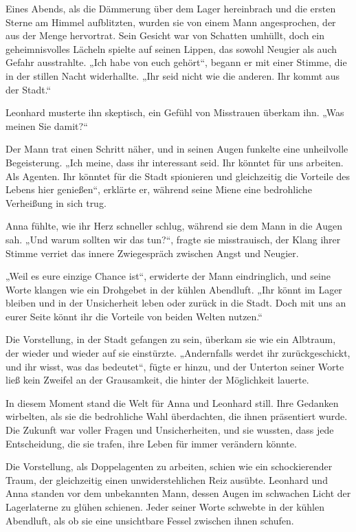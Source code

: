 \documentclass[
]{article}
\begin{document}
Eines Abends, als die Dämmerung über dem Lager hereinbrach und die
ersten Sterne am Himmel aufblitzten, wurden sie von einem Mann
angesprochen, der aus der Menge hervortrat. Sein Gesicht war von
Schatten umhüllt, doch ein geheimnisvolles Lächeln spielte auf seinen
Lippen, das sowohl Neugier als auch Gefahr ausstrahlte. „Ich habe von
euch gehört``, begann er mit einer Stimme, die in der stillen Nacht
widerhallte. „Ihr seid nicht wie die anderen. Ihr kommt aus der Stadt.``

Leonhard musterte ihn skeptisch, ein Gefühl von Misstrauen überkam ihn.
„Was meinen Sie damit?{\kern0pt}``

Der Mann trat einen Schritt näher, und in seinen Augen funkelte eine
unheilvolle Begeisterung. „Ich meine, dass ihr interessant seid. Ihr
könntet für uns arbeiten. Als Agenten. Ihr könntet für die Stadt
spionieren und gleichzeitig die Vorteile des Lebens hier genießen``,
erklärte er, während seine Miene eine bedrohliche Verheißung in sich
trug.

Anna fühlte, wie ihr Herz schneller schlug, während sie dem Mann in die
Augen sah. „Und warum sollten wir das tun?{\kern0pt}``, fragte sie
misstrauisch, der Klang ihrer Stimme verriet das innere Zwiegespräch
zwischen Angst und Neugier.

„Weil es eure einzige Chance ist``, erwiderte der Mann eindringlich, und
seine Worte klangen wie ein Drohgebet in der kühlen Abendluft. „Ihr
könnt im Lager bleiben und in der Unsicherheit leben oder zurück in die
Stadt. Doch mit uns an eurer Seite könnt ihr die Vorteile von beiden
Welten nutzen.``

Die Vorstellung, in der Stadt gefangen zu sein, überkam sie wie ein
Albtraum, der wieder und wieder auf sie einstürzte. „Andernfalls werdet
ihr zurückgeschickt, und ihr wisst, was das bedeutet``, fügte er hinzu,
und der Unterton seiner Worte ließ kein Zweifel an der Grausamkeit, die
hinter der Möglichkeit lauerte.

In diesem Moment stand die Welt für Anna und Leonhard still. Ihre
Gedanken wirbelten, als sie die bedrohliche Wahl überdachten, die ihnen
präsentiert wurde. Die Zukunft war voller Fragen und Unsicherheiten, und
sie wussten, dass jede Entscheidung, die sie trafen, ihre Leben für
immer verändern könnte.

Die Vorstellung, als Doppelagenten zu arbeiten, schien wie ein
schockierender Traum, der gleichzeitig einen unwiderstehlichen Reiz
ausübte. Leonhard und Anna standen vor dem unbekannten Mann, dessen
Augen im schwachen Licht der Lagerlaterne zu glühen schienen. Jeder
seiner Worte schwebte in der kühlen Abendluft, als ob sie eine
unsichtbare Fessel zwischen ihnen schufen.
\end{document}

